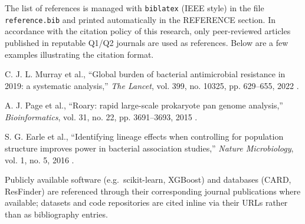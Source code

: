 \documentclass[../main.tex]{subfiles}
\begin{document}
The list of references is managed with \texttt{biblatex} (IEEE style) in the file \texttt{reference.bib} and printed automatically in the REFERENCE section. In accordance with the citation policy of this research, only peer-reviewed articles published in reputable Q1/Q2 journals are used as references. Below are a few examples illustrating the citation format.

C. J. L. Murray et al., ``Global burden of bacterial antimicrobial resistance in 2019: a systematic analysis,'' \textit{The Lancet}, vol. 399, no. 10325, pp. 629--655, 2022 \cite{murray2022global}.

A. J. Page et al., ``Roary: rapid large-scale prokaryote pan genome analysis,'' \textit{Bioinformatics}, vol. 31, no. 22, pp. 3691--3693, 2015 \cite{page2015roary}.

S. G. Earle et al., ``Identifying lineage effects when controlling for population structure improves power in bacterial association studies,'' \textit{Nature Microbiology}, vol. 1, no. 5, 2016 \cite{earle2016identifying}.

Publicly available software (e.g.\ scikit-learn, XGBoost) and databases (CARD, ResFinder) are referenced through their corresponding journal publications where available; datasets and code repositories are cited inline via their URLs rather than as bibliography entries.
\end{document}
